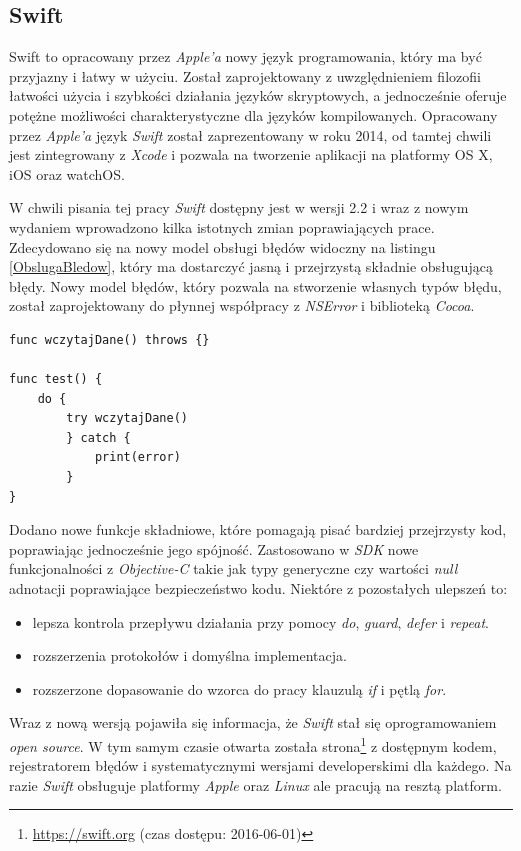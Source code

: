 \documentclass{iiuwb}
\begin{document}
\subsection{Swift}
Swift \cite{Lassoff:2014:Swift} to opracowany przez \textit{Apple'a} nowy język programowania, który ma być przyjazny i łatwy w użyciu. Został zaprojektowany z uwzględnieniem filozofii łatwości użycia i szybkości działania języków skryptowych, a jednocześnie oferuje potężne możliwości charakterystyczne dla języków kompilowanych.	 Opracowany przez \textit{Apple'a} język \textit{Swift} został zaprezentowany w roku 2014, od tamtej chwili jest zintegrowany z \textit{Xcode} i pozwala na tworzenie aplikacji na platformy OS X, iOS oraz watchOS. 

W chwili pisania tej pracy \textit{Swift} dostępny jest w wersji 2.2 i wraz z nowym wydaniem wprowadzono kilka istotnych zmian poprawiających prace. Zdecydowano się na nowy model obsługi błędów widoczny na listingu \ref{ObslugaBledow}, który ma dostarczyć jasną i przejrzystą składnie obsługującą błędy. Nowy model błędów, który pozwala na stworzenie własnych typów błędu, został zaprojektowany do płynnej współpracy z \textit{NSError} i biblioteką \textit{Cocoa}.
\begin{lstlisting}[label=ObslugaBledow, caption=Nowy model obsługi błędów w Swift]
func wczytajDane() throws {}

func test() {
	do {
		try wczytajDane()
		} catch {
			print(error)
		}
}
\end{lstlisting}
Dodano nowe funkcje składniowe, które pomagają pisać bardziej przejrzysty kod, poprawiając jednocześnie jego spójność. Zastosowano w \textit{SDK} nowe funkcjonalności z \textit{Objective-C} takie jak typy generyczne czy wartości \textit{null} adnotacji poprawiające bezpieczeństwo kodu. Niektóre z pozostałych ulepszeń to:
\begin{itemize}
\item lepsza kontrola przepływu działania przy pomocy \textit{do}, \textit{guard}, \textit{defer} i \textit{repeat}.    
\item rozszerzenia protokołów i domyślna implementacja.
\item rozszerzone dopasowanie do wzorca do pracy klauzulą \textit{if} i pętlą \textit{for}.
\end{itemize}
Wraz z nową wersją pojawiła się informacja, że \textit{Swift} stał się oprogramowaniem \textit{open source}. W tym samym czasie otwarta została strona\footnote{\url{https://swift.org} (czas dostępu: 2016-06-01)} z dostępnym kodem, rejestratorem błędów i systematycznymi wersjami developerskimi dla każdego. Na razie \textit{Swift} obsługuje platformy \textit{Apple} oraz \textit{Linux} ale pracują na resztą platform.
\end{document}
